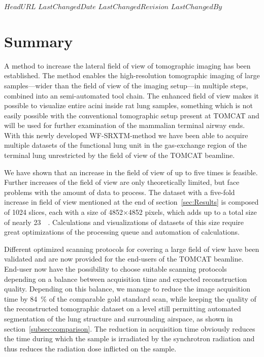 \svnidlong
{$HeadURL$}
{$LastChangedDate$}
{$LastChangedRevision$}
{$LastChangedBy$}
%
\section{Summary}\label{summary}

A method to increase the lateral field of view of tomographic imaging has been established. The method enables the high-resolution tomographic imaging of large samples---wider than the field of view of the imaging setup---in multiple steps, combined into an semi-automated tool chain. The enhanced field of view makes it possible to visualize entire acini inside rat lung samples, something which is not easily possible with the conventional tomographic setup present at TOMCAT and will be used for further examination of the mammalian terminal airway ends. With this newly developed WF-SRXTM-method we have been able to acquire multiple datasets of the functional lung unit in the gas-exchange region of the terminal lung unrestricted by the field of view of the TOMCAT beamline.

We have shown that an increase in the field of view of up to five times is feasible. Further increases of the field of view are only theoretically limited, but face problems with the amount of data to process. The dataset with a five-fold increase in field of view mentioned at the end of section~\ref{sec:Results} is composed of 1024 slices, each with a size of 4852$\times$4852 pixels, which adds up to a total size of nearly \SI{23}{\giga\byte}. Calculations and visualizations of datasets of this size require great optimizations of the processing queue and automation of calculations.

Different optimized scanning protocols for covering a large field of view have been validated and are now provided for the end-users of the TOMCAT beamline. End-user now have the possibility to choose suitable scanning protocols depending on a balance between acquisition time and expected reconstruction quality. Depending on this balance, we manage to reduce the image acquisition time by \SI{84}{\percent} of the comparable gold standard scan, while keeping the quality of the reconstructed tomographic dataset on a level still permitting automated segmentation of the lung structure and surrounding airspace, as shown in section~\ref{subsec:comparison}. The reduction in acquisition time obviously reduces the time during which the sample is irradiated by the synchrotron radiation and thus reduces the radiation dose inflicted on the sample.